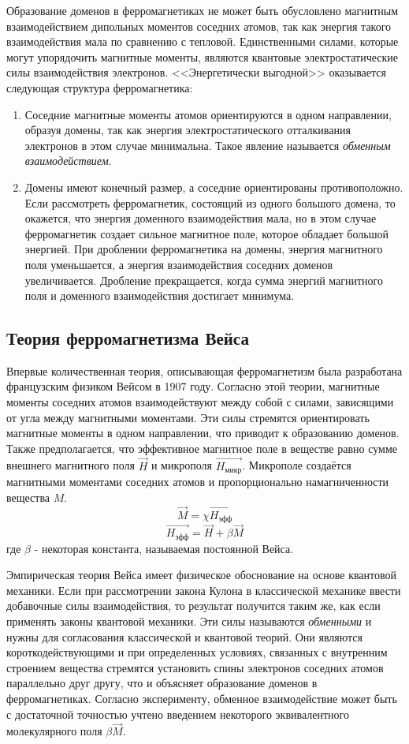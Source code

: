 Образование доменов в ферромагнетиках не может быть обусловлено магнитным взаимодействием дипольных моментов соседних атомов, так как энергия такого взаимодействия мала по сравнению с тепловой. Единственными силами, которые могут упорядочить магнитные моменты, являются квантовые электростатические силы взаимодействия электронов. <<Энергетически выгодной>> оказывается следующая структура ферромагнетика:

\begin{enumerate}
	\item Соседние магнитные моменты атомов ориентируются в одном направлении, образуя домены, так как энергия электростатического отталкивания электронов в этом случае минимальна. Такое явление называется \textit{обменным взаимодействием}.
	
	\item Домены имеют конечный размер, а соседние ориентированы противоположно. Если рассмотреть ферромагнетик, состоящий из одного большого домена, то окажется, что энергия доменного взаимодействия мала, но в этом случае ферромагнетик создает сильное магнитное поле, которое обладает большой энергией. При дроблении ферромагнетика на домены, энергия магнитного поля уменьшается, а энергия взаимодействия соседних доменов увеличивается. Дробление прекращается, когда сумма энергий магнитного поля и доменного взаимодействия достигает минимума.
\end{enumerate}

\subsection*{Теория ферромагнетизма Вейса}

Впервые количественная теория, описывающая ферромагнетизм была разработана французским физиком Вейсом в 1907 году. Согласно этой теории, магнитные моменты соседних атомов взаимодействуют между собой с силами, зависящими от угла между магнитными моментами. Эти силы стремятся ориентировать магнитные моменты в одном направлении, что приводит к образованию доменов. Также предполагается, что эффективное магнитное поле в веществе равно сумме внешнего магнитного поля $\vec{H}$ и микрополя $\vec{H_{микр}}$. Микрополе создаётся магнитными моментами соседних атомов и пропорционально намагниченности вещества $M$.
$$
\vec{M} = \chi \vec{H_{эфф}}
$$
$$
\vec{H_{эфф}} = \vec{H} + \beta \vec{M}
$$
где $\beta$ - некоторая константа, называемая постоянной Вейса.

Эмпирическая теория Вейса имеет физическое обоснование на основе квантовой механики. Если при рассмотрении закона Кулона в классической механике ввести добавочные силы взаимодействия, то результат получится таким же, как если применять законы квантовой механики. Эти силы называются \textit{обменными} и нужны для согласования классической и квантовой теорий. Они являются короткодействующими и при определенных условиях, связанных с внутренним строением вещества стремятся установить спины электронов соседних атомов параллельно друг другу, что и объясняет образование доменов в ферромагнетиках. Согласно эксперименту, обменное взаимодействие может быть с достаточной точностью учтено введением некоторого эквивалентного молекулярного поля $\beta \vec{M}$.


